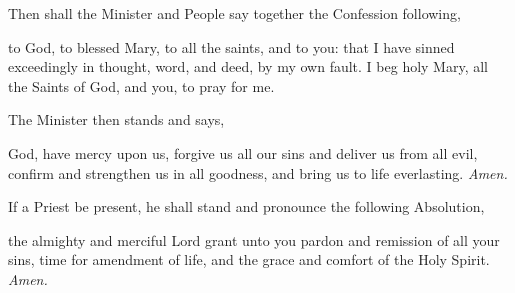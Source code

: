 \begin{multicols}{2}


\begin{rubric}
	Then shall the Minister and People say together the Confession following,
\end{rubric}
 to God, to blessed Mary, to all the saints, and to you: that I have sinned exceedingly in thought, word, and deed, by my own fault. I beg holy Mary, all the Saints of God, and you, to pray for me.

\begin{rubric}
	The Minister then stands and says,
\end{rubric}
\par
{}
 God, have mercy upon us, forgive us all our sins and deliver us from all evil, confirm and strengthen us in all goodness, and bring us to life everlasting. \textit{Amen.}

\begin{rubric}
	If a Priest be present, he shall stand and pronounce the following Absolution,
\end{rubric}
 the almighty and merciful Lord grant unto you pardon {} and remission of all your sins, time for amendment of life, and the grace and comfort of the Holy Spirit. \textit{Amen.}




\end{multicols}
